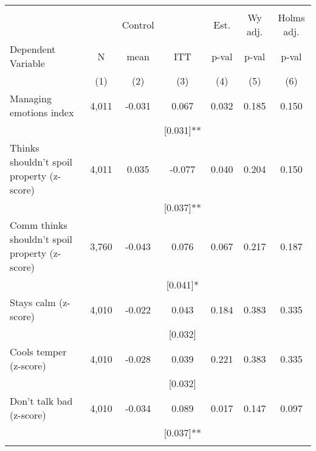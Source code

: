 \begin{tabular}{lcccccc}
\hline \noalign{\smallskip} &  &  &  &  &  & \\
 &  & Control &  & Est. & Wy adj. & Holms adj.\\
Dependent Variable & N & mean & ITT & p-val & p-val & p-val\\
 & (1) & (2) & (3) & (4) & (5) & (6)\\
\noalign{\smallskip}\hline \noalign{\smallskip}Managing emotions index & 4,011 & -0.031 & 0.067 & 0.032 & 0.185 & 0.150\\
 &  &  & [0.031]** &  &  & \\
\quad Thinks shouldn't spoil property (z-score) & 4,011 & 0.035 & -0.077 & 0.040 & 0.204 & 0.150\\
 &  &  & [0.037]** &  &  & \\
\quad Comm thinks shouldn't spoil property (z-score) & 3,760 & -0.043 & 0.076 & 0.067 & 0.217 & 0.187\\
 &  &  & [0.041]* &  &  & \\
\quad Stays calm (z-score) & 4,010 & -0.022 & 0.043 & 0.184 & 0.383 & 0.335\\
 &  &  & [0.032] &  &  & \\
\quad Cools temper (z-score) & 4,010 & -0.028 & 0.039 & 0.221 & 0.383 & 0.335\\
 &  &  & [0.032] &  &  & \\
\quad Don't talk bad (z-score) & 4,010 & -0.034 & 0.089 & 0.017 & 0.147 & 0.097\\
 &  &  & [0.037]** &  &  & \\
\noalign{\smallskip}\hline\end{tabular}
